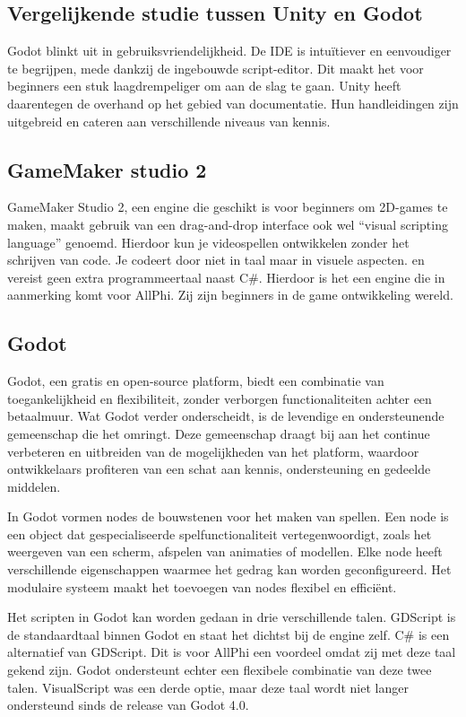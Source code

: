 \subsection{Vergelijkende studie tussen Unity en Godot}
Godot blinkt uit in gebruiksvriendelijkheid. De IDE is intuïtiever en eenvoudiger te begrijpen, mede dankzij de ingebouwde script-editor. Dit maakt het voor beginners een stuk laagdrempeliger om aan de slag te gaan. Unity heeft daarentegen de overhand op het gebied van documentatie. Hun handleidingen zijn uitgebreid en cateren aan verschillende niveaus van kennis. \autocite{flomen2020game}

\subsection{GameMaker studio 2}
GameMaker Studio 2, een engine die geschikt is voor beginners om 2D-games te maken, maakt gebruik van een drag-and-drop interface ook wel ``visual scripting language''  genoemd. Hierdoor kun je videospellen ontwikkelen zonder het schrijven van code. Je codeert door niet in taal maar in visuele aspecten. en vereist geen extra programmeertaal naast C\#. Hierdoor is het een engine die in aanmerking komt voor AllPhi. Zij zijn beginners in de game ontwikkeling wereld. \autocite{cossu2019game}

\subsection{Godot}
Godot, een gratis en open-source platform, biedt een combinatie van toegankelijkheid en flexibiliteit, zonder verborgen functionaliteiten achter een betaalmuur. Wat Godot verder onderscheidt, is de levendige en ondersteunende gemeenschap die het omringt. Deze gemeenschap draagt bij aan het continue verbeteren en uitbreiden van de mogelijkheden van het platform, waardoor ontwikkelaars profiteren van een schat aan kennis, ondersteuning en gedeelde middelen. \autocite{Bradfield2018}

In Godot vormen nodes de bouwstenen voor het maken van spellen. Een node is een object dat gespecialiseerde spelfunctionaliteit vertegenwoordigt, zoals het weergeven van een scherm, afspelen van animaties of modellen. Elke node heeft verschillende eigenschappen waarmee het gedrag kan worden geconfigureerd. Het modulaire systeem maakt het toevoegen van nodes flexibel en efficiënt. \autocite{Bradfield2018}

Het scripten in Godot kan worden gedaan in drie verschillende talen. GDScript is de standaardtaal binnen Godot en staat het dichtst bij de engine zelf. C# is een alternatief van GDScript. Dit is voor AllPhi een voordeel omdat zij met deze taal gekend zijn. Godot ondersteunt echter een flexibele combinatie van deze twee talen.\autocite{Bradfield2018} VisualScript was een derde optie, maar deze taal wordt niet langer ondersteund sinds de release van Godot 4.0.

